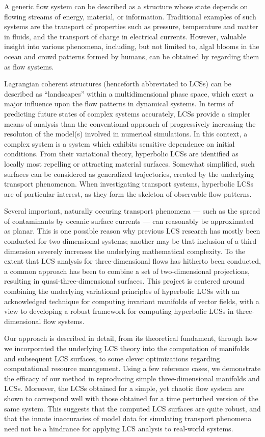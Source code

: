 \begingroup
\vspace{3mm}
A generic flow system can be described as a structure whose state depends on
flowing streams of energy, material, or information. Traditional examples of
such systems are the transport of properties such as pressure, temperature and
matter in fluids, and the transport of charge in electrical currents. However,
valuable insight into various phenomena, including, but not limited to, algal
blooms in the ocean and crowd patterns formed by humans, can be obtained by
regarding them as flow systems.

Lagrangian coherent structures (henceforth abbreviated to LCSs) can be
described as ``landscapes'' within a multidimensional phase space, which exert
a major influence upon the flow patterns in dynamical systems. In terms of
predicting future states of complex systems accurately, LCSs provide a simpler
means of analysis than the conventional approach of progressively increasing
the resoluton of the model(s) involved in numerical simulations. In this
context, a complex system is a system which exhibits sensitive dependence on
initial conditions. From their variational theory, hyperbolic LCSs are
identified as locally most repelling or attracting material surfaces. Somewhat
simplified, such surfaces can be considered as generalized trajectories,
created by the underlying transport phenomenon. When investigating transport
systems, hyperbolic LCSs are of particular interest, as they form the skeleton
of observable flow patterns.

Several important, naturally occuring transport phenomena --- such as the
spread of contaminants by oceanic surface currents --- can reasonably be
approximated as planar. This is one possible reason why previous
LCS research has mostly been conducted for two-dimensional systems; another may
be that inclusion of a third dimension severely increases the underlying
mathematical complexity. To the extent that LCS analysis for three-dimensional
flows has hitherto been conducted, a common approach has been to combine a set
of two-dimensional projections, resulting in quasi-three-dimensional
surfaces. This project is centered around combining the underlying variational
principles of hyperbolic LCSs with an acknowledged technique for computing
invariant manifolds of vector fields, with a view to developing a robust
framework for computing hyperbolic LCSs in three-dimensional flow systems.

Our approach is described in detail, from its theoretical fundament, through
how we incorporated the underlying LCS theory into the computation of manifolds
and subsequent LCS surfaces, to some clever optimizations regarding
computational resource management. Using a few reference cases, we demonstrate
the efficacy of our method in reproducing simple three-dimensional manifolds
and LCSs. Moreover, the LCSs obtained for a simple, yet chaotic flow
system are shown to correspond well with those obtained for a time perturbed
version of the same system. This suggests that the computed LCS surfaces are
quite robust, and that the innate inaccuracies of model data for simulating
transport phenomena need not be a hindrance for applying LCS analysis to
real-world systems.

